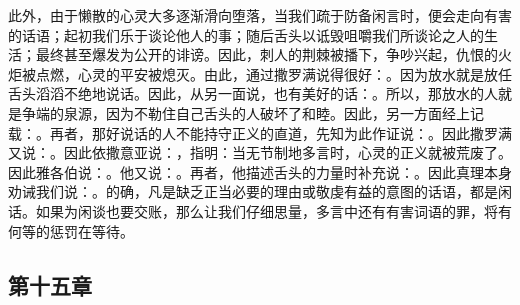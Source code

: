 此外，由于懒散的心灵大多逐渐滑向堕落，当我们疏于防备闲言时，便会走向有害的话语；起初我们乐于谈论他人的事；随后舌头以诋毁咀嚼我们所谈论之人的生活；最终甚至爆发为公开的诽谤。因此，刺人的荆棘被播下，争吵兴起，仇恨的火炬被点燃，心灵的平安被熄灭。由此，通过撒罗满说得很好：。因为放水就是放任舌头滔滔不绝地说话。因此，从另一面说，也有美好的话：。所以，那放水的人就是争端的泉源，因为不勒住自己舌头的人破坏了和睦。因此，另一方面经上记载：。再者，那好说话的人不能持守正义的直道，先知为此作证说：。因此撒罗满又说：。因此依撒意亚说：，指明：当无节制地多言时，心灵的正义就被荒废了。因此雅各伯说：。他又说：。再者，他描述舌头的力量时补充说：。因此真理本身劝诫我们说：。的确，凡是缺乏正当必要的理由或敬虔有益的意图的话语，都是闲话。如果为闲谈也要交账，那么让我们仔细思量，多言中还有有害词语的罪，将有何等的惩罚在等待。\par


\subsection{第十五章}

\par

